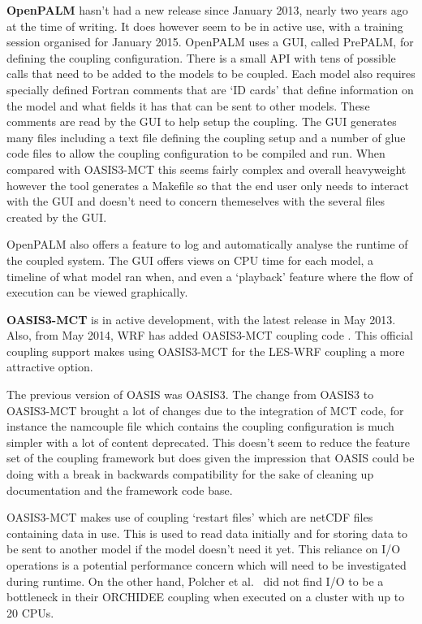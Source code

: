 \documentclass{acm_proc_article-sp}
\renewcommand{\_}{\underscore\hspace{0pt}}
\begin{document}
\textbf{OpenPALM} hasn't had a new release since January 2013, nearly two years
ago at the time of writing. It does however seem to be in active use, with a
training session organised for January 2015. OpenPALM uses a GUI, called
PrePALM, for defining the coupling configuration. There is a small API with tens
of possible calls that need to be added to the models to be coupled. Each model
also requires specially defined Fortran comments that are `ID cards' that define
information on the model and what fields it has that can be sent to other
models. These comments are read by the GUI to help setup the coupling. The GUI
generates many files including a text file defining the coupling setup and a
number of glue code files to allow the coupling configuration to be compiled and
run. When compared with OASIS3-MCT this seems fairly complex and overall
heavyweight however the tool generates a Makefile so that the end user only
needs to interact with the GUI and doesn't need to concern themeselves with the
several files created by the GUI.

OpenPALM also offers a feature to log and automatically analyse the runtime of
the coupled system. The GUI offers views on CPU time for each model, a timeline
of what model ran when, and even a `playback' feature where the flow of
execution can be viewed graphically.

\textbf{OASIS3-MCT} is in active development, with the latest release in May
2013. Also, from May 2014, WRF has added OASIS3-MCT coupling code
\cite{ENES2014}. This official coupling support makes using OASIS3-MCT for the
LES-WRF coupling a more attractive option.

The previous version of OASIS was OASIS3. The change from OASIS3 to OASIS3-MCT
brought a lot of changes due to the integration of MCT code, for instance the
namcouple file which contains the coupling configuration is much simpler with a
lot of content deprecated. This doesn't seem to reduce the feature set of the
coupling framework but does given the impression that OASIS could be doing with
a break in backwards compatibility for the sake of cleaning up documentation and
the framework code base.

OASIS3-MCT makes use of coupling `restart files' which are netCDF files
containing data in use. This is used to read data initially and for storing data
to be sent to another model if the model doesn't need it yet. This reliance on
I/O operations is a potential performance concern which will need to be
investigated during runtime. On the other hand, Polcher et al.\
\cite{Polcher2013} did not find I/O to be a bottleneck in their ORCHIDEE
coupling when executed on a cluster with up to 20 CPUs.
\end{document}
